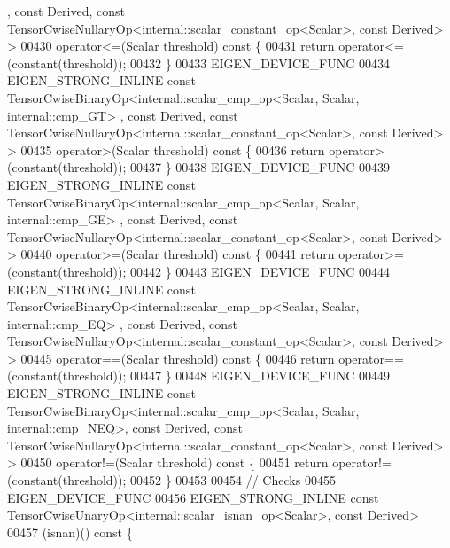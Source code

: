 \begin{DoxyCode}
      , \textcolor{keyword}{const} Derived, \textcolor{keyword}{const} TensorCwiseNullaryOp<internal::scalar\_constant\_op<Scalar>, \textcolor{keyword}{const} Derived> >
00430     operator<=(Scalar threshold)\textcolor{keyword}{ const }\{
00431       \textcolor{keywordflow}{return} operator<=(constant(threshold));
00432     \}
00433     EIGEN\_DEVICE\_FUNC
00434     EIGEN\_STRONG\_INLINE \textcolor{keyword}{const} TensorCwiseBinaryOp<internal::scalar\_cmp\_op<Scalar, Scalar, internal::cmp\_GT>
      , \textcolor{keyword}{const} Derived, \textcolor{keyword}{const} TensorCwiseNullaryOp<internal::scalar\_constant\_op<Scalar>, \textcolor{keyword}{const} Derived> >
00435     operator>(Scalar threshold)\textcolor{keyword}{ const }\{
00436       \textcolor{keywordflow}{return} operator>(constant(threshold));
00437     \}
00438     EIGEN\_DEVICE\_FUNC
00439     EIGEN\_STRONG\_INLINE \textcolor{keyword}{const} TensorCwiseBinaryOp<internal::scalar\_cmp\_op<Scalar, Scalar, internal::cmp\_GE>
      , \textcolor{keyword}{const} Derived, \textcolor{keyword}{const} TensorCwiseNullaryOp<internal::scalar\_constant\_op<Scalar>, \textcolor{keyword}{const} Derived> >
00440     operator>=(Scalar threshold)\textcolor{keyword}{ const }\{
00441       \textcolor{keywordflow}{return} operator>=(constant(threshold));
00442     \}
00443     EIGEN\_DEVICE\_FUNC
00444     EIGEN\_STRONG\_INLINE \textcolor{keyword}{const} TensorCwiseBinaryOp<internal::scalar\_cmp\_op<Scalar, Scalar, internal::cmp\_EQ>
      , \textcolor{keyword}{const} Derived, \textcolor{keyword}{const} TensorCwiseNullaryOp<internal::scalar\_constant\_op<Scalar>, \textcolor{keyword}{const} Derived> >
00445     operator==(Scalar threshold)\textcolor{keyword}{ const }\{
00446       \textcolor{keywordflow}{return} operator==(constant(threshold));
00447     \}
00448     EIGEN\_DEVICE\_FUNC
00449     EIGEN\_STRONG\_INLINE \textcolor{keyword}{const} TensorCwiseBinaryOp<internal::scalar\_cmp\_op<Scalar, Scalar,
       internal::cmp\_NEQ>, \textcolor{keyword}{const} Derived, \textcolor{keyword}{const} TensorCwiseNullaryOp<internal::scalar\_constant\_op<Scalar>, \textcolor{keyword}{const} Derived> >
00450     operator!=(Scalar threshold)\textcolor{keyword}{ const }\{
00451       \textcolor{keywordflow}{return} operator!=(constant(threshold));
00452     \}
00453 
00454     \textcolor{comment}{// Checks}
00455     EIGEN\_DEVICE\_FUNC
00456     EIGEN\_STRONG\_INLINE \textcolor{keyword}{const} TensorCwiseUnaryOp<internal::scalar\_isnan\_op<Scalar>, \textcolor{keyword}{const} Derived>
00457     (isnan)()\textcolor{keyword}{ const }\{

\end{DoxyCode}
